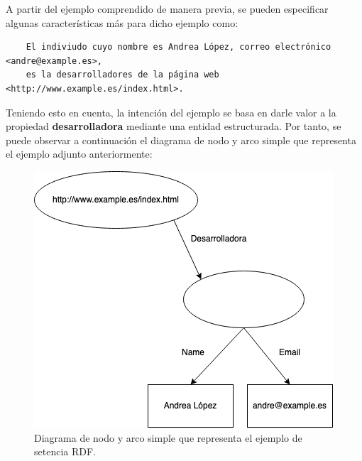 \documentclass[11pt]{report}
\begin{document}

A partir del ejemplo comprendido de manera previa, se pueden especificar algunas características más para dicho ejemplo como:

\begin{verbatim}
	El indiviudo cuyo nombre es Andrea López, correo electrónico <andre@example.es>, 
	es la desarrolladores de la página web <http://www.example.es/index.html>.
\end{verbatim}

Teniendo esto en cuenta, la intención del ejemplo se basa en darle valor a la propiedad \textbf{desarrolladora} mediante una entidad estructurada. Por tanto, se puede observar a continuación el diagrama de nodo y arco simple que representa el ejemplo adjunto anteriormente:

\begin{figure}[H]
	\centering
	\includegraphics[scale=0.7]{../img/Propiedad-Estructurada.png}
	\caption{Diagrama de nodo y arco simple que representa el ejemplo de setencia RDF.}
	\label{fig:Diagrama-Nodo-Arco-2}
\end{figure}

\end{document}
